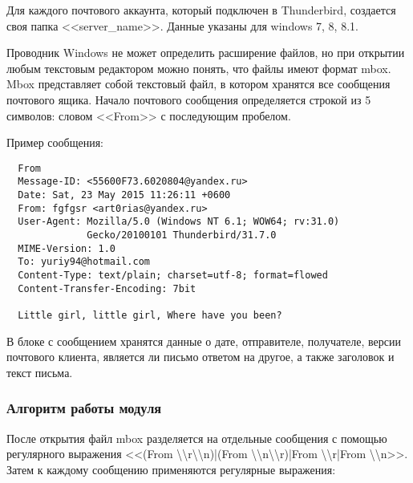 Для каждого почтового аккаунта, который подключен в Thunderbird, создается своя папка <<server\_name>>. Данные указаны для windows 7, 8, 8.1.

Проводник Windows не может определить расширение файлов, но при открытии любым текстовым редактором можно понять, что файлы имеют формат mbox. Mbox представляет собой текстовый файл, в котором хранятся все сообщения почтового ящика. Начало почтового сообщения определяется строкой из 5 символов: словом <<From>> с последующим пробелом.

Пример сообщения:

\begin{verbatim}
  From 
  Message-ID: <55600F73.6020804@yandex.ru>
  Date: Sat, 23 May 2015 11:26:11 +0600
  From: fgfgsr <art0rias@yandex.ru>
  User-Agent: Mozilla/5.0 (Windows NT 6.1; WOW64; rv:31.0) 
              Gecko/20100101 Thunderbird/31.7.0
  MIME-Version: 1.0
  To: yuriy94@hotmail.com
  Content-Type: text/plain; charset=utf-8; format=flowed
  Content-Transfer-Encoding: 7bit

  Little girl, little girl, Where have you been?
\end{verbatim}

В блоке с сообщением хранятся данные о дате, отправителе, получателе, версии почтового клиента, является ли письмо ответом на другое, а также заголовок и текст письма.

\subsubsection{Алгоритм работы модуля}

После открытия файл mbox разделяется на отдельные сообщения с помощью регулярного выражения <<(From \textbackslash \textbackslash r\textbackslash \textbackslash n)|(From \textbackslash \textbackslash n\textbackslash \textbackslash r)|From \textbackslash \textbackslash r|From \textbackslash \textbackslash n>>. Затем к каждому сообщению применяются регулярные выражения:

